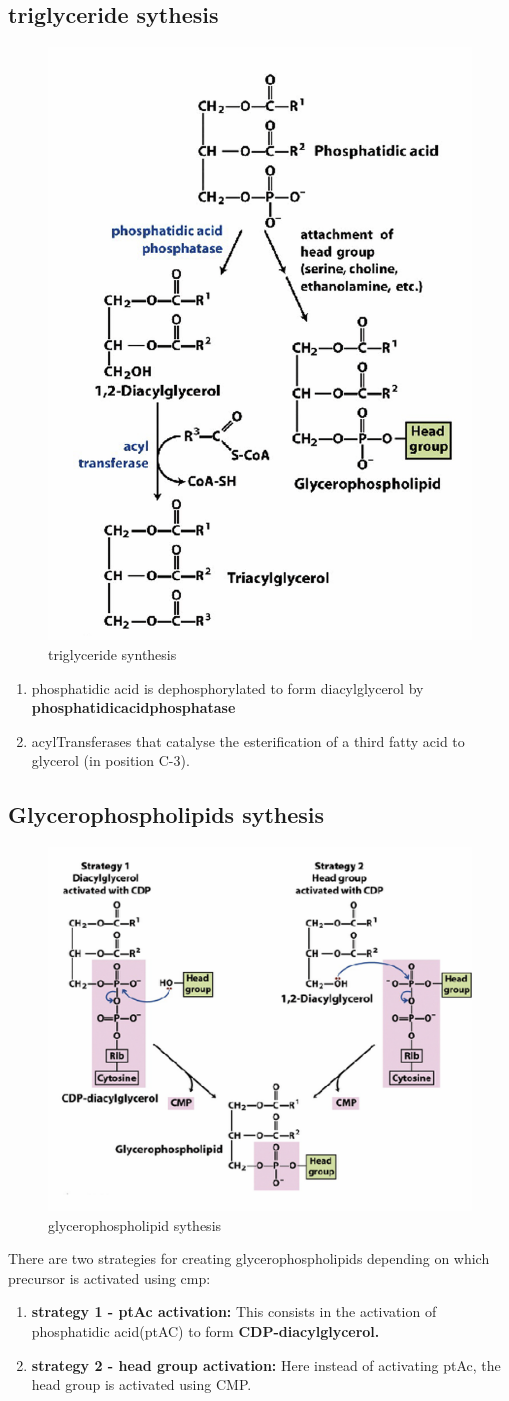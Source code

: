 \documentclass[../main.tex]{subfiles}
\begin{document}
\subsection{triglyceride sythesis}
\begin{figure}[H]
    \centering
    \includegraphics[width=0.4\linewidth]{TAG_syth.png}
    \caption{triglyceride synthesis}
    \label{fig:enter-label}
\end{figure}
\begin{enumerate}
    \item phosphatidic acid is dephosphorylated to form diacylglycerol by \textbf{\gls{phosphatidicacidphosphatase}}
    
    \item \gls{acylTransferases} that catalyse the esterification of a third fatty acid to glycerol (in position C-3).
\end{enumerate}


\subsection{Glycerophospholipids sythesis}
\begin{figure}[H]
    \centering
    \includegraphics[width=0.5\linewidth]{lectures//bcII7+bcII8/glycerophospholipid.png}
    \caption{glycerophospholipid sythesis}
    \label{fig:enter-label}
\end{figure}
There are two strategies for creating glycerophospholipids depending on which precursor is activated using cmp:
\begin{enumerate}
    \item \textbf{strategy 1 - ptAc activation:} This consists in the activation of phosphatidic acid(ptAC) to form \textbf{CDP-diacylglycerol.}

    \item \textbf{strategy 2 - head group activation:} Here instead of activating ptAc, the head group is activated using CMP.
\end{enumerate}
\end{document}

